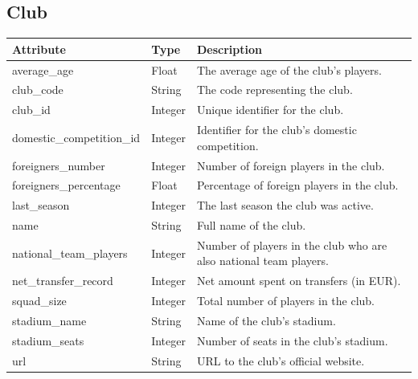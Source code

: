 \documentclass{Configuration_Files/PoliMi3i_thesis}
\begin{document}
\subsection*{Club}
\begin{longtable}{|p{4cm}|p{3cm}|p{8cm}|}
\hline
\textbf{Attribute} & \textbf{Type} & \textbf{Description} \\
\hline
\endhead
average\_age & Float & The average age of the club's players. \\
club\_code & String & The code representing the club. \\
club\_id & Integer & Unique identifier for the club. \\
domestic\_competition\_id & Integer & Identifier for the club's domestic competition. \\
foreigners\_number & Integer & Number of foreign players in the club. \\
foreigners\_percentage & Float & Percentage of foreign players in the club. \\
last\_season & Integer & The last season the club was active. \\
name & String & Full name of the club. \\
national\_team\_players & Integer & Number of players in the club who are also national team players. \\
net\_transfer\_record & Integer & Net amount spent on transfers (in EUR). \\
squad\_size & Integer & Total number of players in the club. \\
stadium\_name & String & Name of the club's stadium. \\
stadium\_seats & Integer & Number of seats in the club's stadium. \\
url & String & URL to the club's official website. \\
\hline
\end{longtable}
\end{document}
